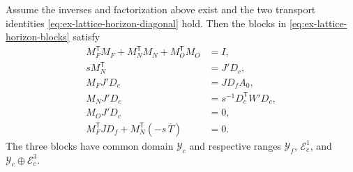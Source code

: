 \begin{proposition}
\label{prop:ex-lattice-horizon-roll}
Assume the inverses and factorization above exist and the two transport
identities \eqref{eq:ex-lattice-horizon-diagonal} hold. Then the blocks in
\eqref{eq:ex-lattice-horizon-blocks} satisfy
\begin{align}
 M_F^{\mathsf T}M_F+M_N^{\mathsf T}M_N+M_O^{\mathsf T}M_O&=I,
 \label{eq:ex-lattice-horizon-gram}\\
 sM_N^{\mathsf T}&=J'D_c,
 \label{eq:ex-lattice-horizon-normal}\\
 M_FJ'D_c&=JD_fA_0,
 \label{eq:ex-lattice-horizon-primal}\\
 M_NJ'D_c&=s^{-1}D_c^{\mathsf T}W'D_c,
 \label{eq:ex-lattice-horizon-kinetic}\\
 M_OJ'D_c&=0,
 \label{eq:ex-lattice-horizon-image}\\
 M_F^{\mathsf T}JD_f+M_N^{\mathsf T}(-s\,\overline T)&=0.
 \label{eq:ex-lattice-horizon-orthogonal}
\end{align}
The three blocks have common domain $\mathcal Y_c$ and respective ranges
$\mathcal Y_f$, $\mathcal E_c^1$, and $\mathcal Y_c\oplus\mathcal E_c^3$.
\end{proposition}

